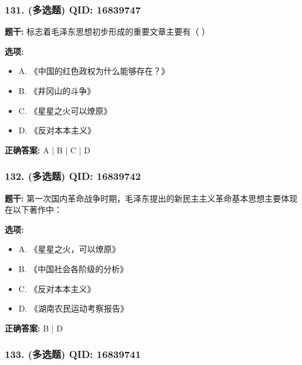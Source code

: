 \documentclass[12pt,UTF8]{ctexart}
\begin{document}
\subsubsection*{131. (多选题) \small QID: 16839747}

\textbf{题干:}
标志着毛泽东思想初步形成的重要文章主要有（ ）

\textbf{选项:}
\begin{itemize}[leftmargin=*]

  \item A. 《中国的红色政权为什么能够存在？》

  \item B. 《井冈山的斗争》

  \item C. 《星星之火可以燎原》

  \item D. 《反对本本主义》

\end{itemize}

\textbf{正确答案:}
A | B | C | D

\vspace{0.3em}\hrulefill\vspace{0.7em}

\subsubsection*{132. (多选题) \small QID: 16839742}

\textbf{题干:}
第一次国内革命战争时期，毛泽东提出的新民主主义革命基本思想主要体现在以下著作中：

\textbf{选项:}
\begin{itemize}[leftmargin=*]

  \item A. 《星星之火，可以燎原》

  \item B. 《中国社会各阶级的分析》

  \item C. 《反对本本主义》

  \item D. 《湖南农民运动考察报告》

\end{itemize}

\textbf{正确答案:}
B | D

\vspace{0.3em}\hrulefill\vspace{0.7em}

\subsubsection*{133. (多选题) \small QID: 16839741}
\end{document}
